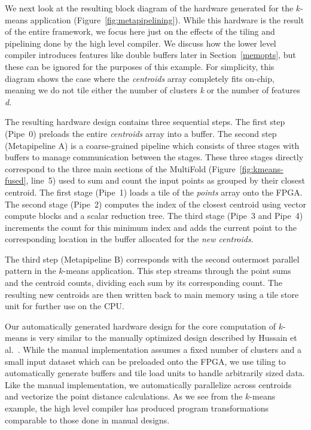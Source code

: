 We next look at the resulting block diagram of the hardware generated for the
$k$-means application (Figure~\ref{fig:metapipelining}).
While this hardware is the result of the entire framework, we focus here just
on the effects of the tiling and pipelining done by the high level compiler.
We discuss how the lower level compiler introduces features like
double buffers later in Section~\ref{memopts}, but these can be ignored
for the purposes of this example.
For simplicity, this diagram shows the case where the \emph{centroids} array completely fits on-chip, meaning
we do not tile either the number of clusters \emph{k} or the number of features \emph{d}.

The resulting hardware design contains three sequential steps.
The first step (Pipe~0) preloads the entire \emph{centroids} array into a buffer.
The second step (Metapipeline A) is a coarse-grained pipeline which consists of three stages with buffers to manage communication between the stages.
These three stages directly correspond to the three main sections of the MultiFold (Figure~\ref{fig:kmeans-fused}, line~5) used to sum and count the input points as grouped by their
closest centroid. The first stage (Pipe~1) loads a tile of the \emph{points} array onto the FPGA. The second stage (Pipe~2) computes the index of the closest centroid using vector compute blocks and a scalar reduction
tree. The third stage (Pipe~3 and Pipe~4) increments the count for this minimum index and adds the current point to the corresponding location in the
buffer allocated for the \emph{new centroids}.

The third step (Metapipeline B) corresponds with the second outermost parallel pattern in the $k$-means application.
This step streams through the point sums and the centroid counts, dividing each sum by its corresponding count. The resulting new centroids
are then written back to main memory using a tile store unit for further use on the CPU.

Our automatically generated hardware design for the core computation of $k$-means is very similar to the manually optimized design described by Hussain et al.~\cite{hwkmeans}.
While the manual implementation assumes a fixed number of clusters and a small input dataset which can be preloaded onto the FPGA, we use tiling to automatically generate
buffers and tile load units to handle arbitrarily sized data. Like the manual implementation, we automatically parallelize across centroids
and vectorize the point distance calculations. As we see from the $k$-means example, the high level compiler has produced program transformations comparable to
those done in manual designs.

